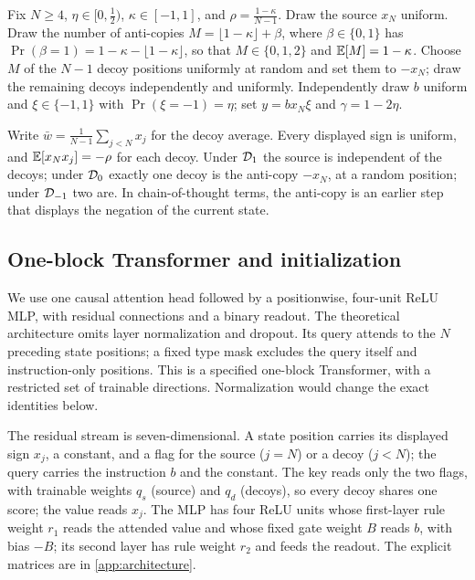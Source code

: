 \begin{definition}
\label{def:Dkappa}
Fix $N\ge4$, $\eta\in[0,\tfrac{1}{2})$, $\kappa\in[-1,1]$, and $\rho=\tfrac{1-\kappa}{N-1}$.
Draw the source $x_N$ uniform. Draw the number of anti-copies $M=\lfloor1-\kappa\rfloor+\beta$, where
$\beta\in\{0,1\}$ has $\Pr(\beta=1)=1-\kappa-\lfloor1-\kappa\rfloor$, so that $M\in\{0,1,2\}$ and $\mathbb E[M]=1-\kappa$.
Choose $M$ of the $N-1$ decoy positions uniformly at random and set them to $-x_N$; draw the remaining decoys independently and uniformly.
Independently draw $b$ uniform and $\xi\in\{-1,1\}$ with $\Pr(\xi=-1)=\eta$;
set $y=b x_N \xi$ and $\gamma=1-2\eta$.
\end{definition}
Write $\bar w=\tfrac{1}{N-1}\sum_{j<N}x_j$ for the decoy average.
Every displayed sign is uniform, and $\mathbb E[x_N x_j]=-\rho$ for each decoy.
Under $\mathcal D_{1}$ the source is independent of the decoys; under $\mathcal D_{0}$ exactly one decoy is the anti-copy $-x_N$, at a random position;
under $\mathcal D_{-1}$ two are. In chain-of-thought terms, the anti-copy is an earlier step that displays the negation of the current state.

\subsection{One-block Transformer and initialization}
\label{sec:architecture}
We use one causal attention head followed by a positionwise, four-unit ReLU MLP, with residual connections and a binary readout.
The theoretical architecture omits layer normalization and dropout. Its query attends to the $N$ preceding state positions;
a fixed type mask excludes the query itself and instruction-only positions. This is a specified one-block Transformer,
with a restricted set of trainable directions. Normalization would change the exact identities below.

The residual stream is seven-dimensional. A state position carries its displayed sign $x_j$, a constant, and a flag for the source ($j=N$)
or a decoy ($j<N$); the query carries the instruction $b$ and the constant. The key reads only the two flags, with trainable weights $q_s$ (source)
and $q_d$ (decoys), so every decoy shares one score; the value reads $x_j$. The MLP has four ReLU units whose first-layer rule weight $r_1$ reads
the attended value and whose fixed gate weight $B$ reads $b$, with bias $-B$; its second layer has rule weight $r_2$ and feeds the readout.
The explicit matrices are in \cref{app:architecture}.

